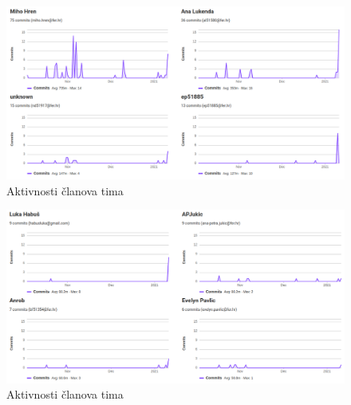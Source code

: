 		\begin{figure}[H]
			\includegraphics[scale=0.3]{slike/promjene1.png}
			\centering
			\caption{Aktivnosti članova tima}
			\label{fig:promjene1}
		\end{figure}

		\begin{figure}[H]
			\includegraphics[scale=0.3]{slike/promjene2.png}
			\centering
			\caption{Aktivnosti članova tima}
			\label{fig:promjene2}
		\end{figure}